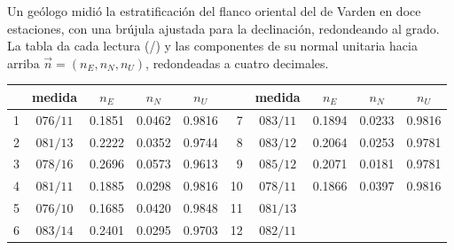 \begin{problem}
\label{pb:b1:field-lab-methods-1:1}
Un geólogo midió la estratificación del flanco oriental del  de Varden en doce estaciones, con
una brújula ajustada para la declinación, redondeando al grado. La tabla da cada lectura (/) y las componentes de su normal unitaria hacia arriba $\vec n = (n_E, n_N, n_U)$,
redondeadas a cuatro decimales.
\begin{center}
\small
\begin{tabular}{rcccc@{\qquad}rcccc}
\hline
 & medida & $n_E$ & $n_N$ & $n_U$ & & medida & $n_E$ & $n_N$ & $n_U$ \\
\hline
1 & $076/11$ & 0.1851 & 0.0462 & 0.9816 & 7 & $083/11$ & 0.1894 & 0.0233 & 0.9816 \\
2 & $081/13$ & 0.2222 & 0.0352 & 0.9744 & 8 & $083/12$ & 0.2064 & 0.0253 & 0.9781 \\
3 & $078/16$ & 0.2696 & 0.0573 & 0.9613 & 9 & $085/12$ & 0.2071 & 0.0181 & 0.9781 \\
4 & $081/11$ & 0.1885 & 0.0298 & 0.9816 & 10 & $078/11$ & 0.1866 & 0.0397 & 0.9816 \\
5 & $076/10$ & 0.1685 & 0.0420 & 0.9848 & 11 & $081/13$ & & & \\
6 & $083/14$ & 0.2401 & 0.0295 & 0.9703 & 12 & $082/11$ & & & \\
\hline
\end{tabular}
\end{center}


\end{problem}
